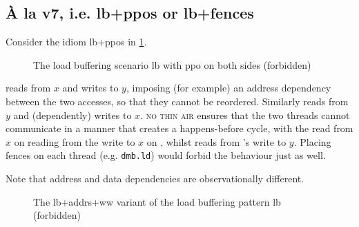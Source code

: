 \documentclass[a4paper]{article}
\begin{document}
\subsection{\`A la v7, i.e. {\sf lb+ppos} or {\sf lb+fences}} 

Consider the idiom \textsf{lb+ppos} in \myfig\ref{fig:lb}.

\begin{figure}[!h]
\vspace*{-2mm}
\begin{center}
\end{center}
\vspace*{-8mm}
\caption{The load buffering scenario \textsf{lb} with ppo on both sides (forbidden) \label{fig:lb}}
\vspace*{-2mm}
\end{figure}

 reads from $x$ and writes to $y$, imposing (for example) an address
dependency between the two accesses, so that they cannot be reordered.
Similarly  reads from $y$ and (dependently) writes to $x$.  \textsc{no
thin air} ensures that the two threads cannot communicate in a manner that
creates a happens-before cycle, with the read from $x$ on  reading from
the write to $x$ on , whilst  reads from 's write to
$y$. Placing fences on each thread (e.g. {\tt dmb.ld}) would forbid the
behaviour just as well.


Note that address and data dependencies are observationally different.

\begin{figure}[h]
\vspace*{-2mm}
\begin{center}
\end{center}
\vspace*{-8mm}
\caption{The \textsf{lb+addrs+ww} variant of the load buffering pattern \textsf{lb} (forbidden) \label{fig:lb+addrs+ww}}
\vspace*{-5mm}
\end{figure}
\end{document}
